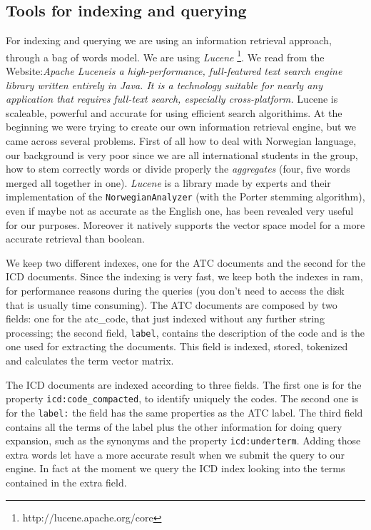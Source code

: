 \documentclass{article}
\begin{document}
\subsection{Tools for indexing and querying}
For indexing and querying we are using an information retrieval approach, through a bag of words model. We are using \emph{Lucene} \footnote{http://lucene.apache.org/core}. We read from the Website:\emph{Apache Lucene\TM is a high-performance, full-featured text search engine library written entirely in Java. It is a technology suitable for nearly any application that requires full-text search, especially cross-platform.} Lucene is scaleable, powerful and accurate for using efficient search algorithims.
At the beginning we were trying to create our own information retrieval engine, but we came across several problems. First of all how to deal with Norwegian language, our background is very poor since we are all international students in the group, how to stem correctly words or divide properly the \emph{aggregates} (four, five words merged all together in one). \emph{Lucene} is a library made by experts and their implementation of the \texttt{NorwegianAnalyzer} (with the Porter stemming algorithm), even if maybe not as accurate as the English one, has been revealed very useful for our purposes. Moreover it natively supports the vector space model for a more accurate retrieval than boolean.

We keep two different indexes, one for the ATC documents and the second for the ICD documents. Since the indexing is very fast, we keep both the indexes in ram, for performance reasons during the queries (you don't need to access the disk that is usually time consuming). The ATC documents are composed by two fields: one for the atc\_code, that just indexed without any further string processing; the second field, \texttt{label}, contains the description of the code and is the one used for extracting the documents. This field is indexed, stored, tokenized and calculates the term vector matrix.

The ICD documents are indexed according to three fields. The first one is for the property \texttt{icd:code\_compacted}, to identify uniquely the codes. The second one is for the \texttt{label:} the field has the same properties as the ATC label. The third field contains all the terms of the label plus the other information for doing query expansion, such as the synonyms and the property \texttt{icd:underterm}. Adding those extra words let have a more accurate result when we submit the query to our engine. In fact at the moment we query the ICD index looking into the terms contained in the extra field.
\end{document}
